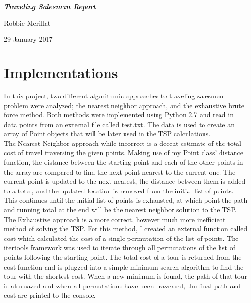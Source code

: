 \documentclass[11pt]{article}
\newcommand\tab[1][.5in]{\hspace*{#1}}
\begin{document}
\begin{titlepage}
\vspace*{\fill}
{
    \centering
    \bfseries
    \emph{\Huge Traveling Salesman Report}
    \vskip 1.5in

    \Large Robbie Merillat \\
    \vskip 2in

    29 January 2017

}
\vspace*{\fill}
\clearpage
\end{titlepage}

\section{Implementations}
\tab In this project, two different algorithmic approaches to traveling salesman problem were analyzed; the nearest neighbor approach, and the exhaustive brute force method. Both methods were implemented using Python 2.7 and read in data points from an external file called test.txt. The data is used to create an array of Point objects that will be later used in the TSP calculations.\\
\tab The Nearest Neighbor approach while incorrect is a decent estimate of the total cost of travel traversing the given points. Making use of my Point class' distance function, the distance between the starting point and each of the other points in the array are compared to find the next point nearest to the current one. The current point is updated to the next nearest, the distance between them is added to a total, and the updated location is removed from the initial list of points. This continues until the initial list of points is exhausted, at which point the  path and running total at the end will be the nearest neighbor solution to the TSP.\\
\tab The Exhaustive approach is a more correct, however much more inefficient method of solving the TSP. For this method, I created an external function called cost which calculated the cost of a single permutation of the list of points. The itertools framework was used to iterate through all permutations of the list of points following the starting point. The total cost of a tour is returned from the cost function and is plugged into a simple minimum search algorithm to find the tour with the shortest cost. When a new minimum is found, the path of that tour is also saved and when all permutations have been traversed, the final path and cost are printed to the console.\par
\end{document}
